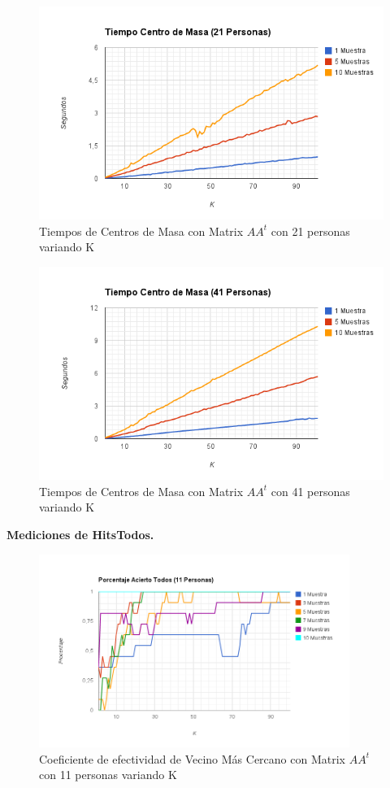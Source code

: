 \begin{figure}[H]
\includegraphics[width=1\textwidth]{img/imagef8.png}
     \caption{Tiempos de Centros de Masa con Matrix $AA^t$ con 21 personas variando K}
\end{figure}

\begin{figure}[H]
\includegraphics[width=1\textwidth]{img/imagef9.png}
     \caption{Tiempos de Centros de Masa con Matrix $AA^t$ con 41 personas variando K}
\end{figure}


\textbf{Mediciones de HitsTodos. }

\begin{figure}[H]
\includegraphics[width=0.9\textwidth]{img/imagef10.png}
     \caption{Coeficiente de efectividad de Vecino Más Cercano con Matrix $AA^t$ con 11 personas variando K}
\end{figure}

